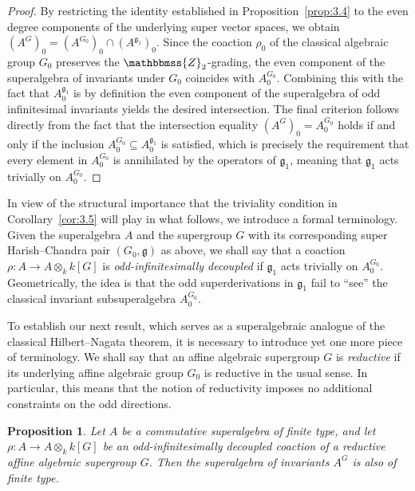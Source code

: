 \documentclass[11pt,a4paper,reqno,noamsfonts]{amsart}
\numberwithin{equation}{section}
\newtheorem{proposition}[theorem]{Proposition}
\theoremstyle{definition}
\theoremstyle{remark}
\newcommand{\ZZ}{\ensuremath{\mathbbmss{Z}}}
\newcommand{\gfrak}{\ensuremath{\mathfrak{g}}}
\begin{document}
\begin{proof}
By restricting the identity established in Proposition~\ref{prop:3.4} to the even degree components of the underlying super vector spaces, we obtain $(A^G)_0 = (A^{G_0})_0 \cap (A^{\mathfrak{g}_1})_0$. Since the coaction $\rho_0$ of the classical algebraic group $G_0$ preserves the $\ZZ_2$-grading, the even component of the superalgebra of invariants under $G_0$ coincides with $A_{0}^{G_{0}}$. Combining this with the fact that $A_{0}^{\gfrak_{1}}$ is by definition the even component of the superalgebra of odd infinitesimal invariants yields the desired intersection. The final criterion follows directly from the fact that the intersection equality $(A^G)_0 = A_0^{G_0}$ holds if and only if the inclusion $A_0^{G_0} \subseteq A_0^{\gfrak_1}$ is satisfied, which is precisely the requirement that every element in $A_{0}^{G_{0}}$ is annihilated by the operators of $\gfrak_{1}$, meaning that $\gfrak_{1}$ acts trivially on $A_{0}^{G_{0}}$.
\end{proof}

In view of the structural importance that the triviality condition in Corollary~\ref{cor:3.5} will play in what follows, we introduce a formal terminology. Given the superalgebra $A$ and the supergroup $G$ with its corresponding super Harish--Chandra pair $(G_0,\gfrak)$ as above, we shall say that a coaction $\rho \colon A \to A \otimes_k k[G]$ is \emph{odd-infinitesimally decoupled} if $\gfrak_{1}$ acts trivially on $A_{0}^{G_{0}}$. Geometrically, the idea is that the odd superderivations in $\gfrak_{1}$ fail to ``see'' the classical invariant subsuperalgebra $A_{0}^{G_{0}}$.

To establish our next result, which serves as a superalgebraic analogue of the classical Hilbert--Nagata theorem, it is necessary to introduce yet one more piece of terminology. We shall say that an affine algebraic supergroup $G$ is \emph{reductive} if its underlying affine algebraic group $G_0$ is reductive in the usual sense. In particular, this means that the notion of reductivity imposes no additional constraints on the odd directions.

\begin{proposition}\label{prop:3.6}
Let $A$ be a commutative superalgebra of finite type, and let $\rho \colon A \to A \otimes_k k[G]$ be an odd-infinitesimally decoupled coaction of a reductive affine algebraic supergroup $G$. Then the superalgebra of invariants $A^G$ is also of finite type.
\end{proposition}
\end{document}
